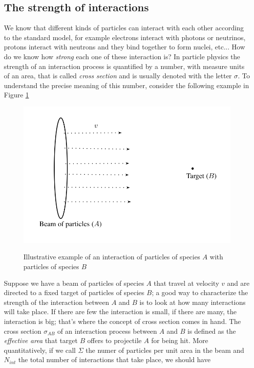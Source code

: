 \documentclass[11pt, a4paper,oneside,openright]{book}
\numberwithin{equation}{section}
\begin{document}
\subsection{The strength of interactions}
We know that different kinds of particles can interact with each other according to the standard model, for example electrons interact with photons or neutrinos, protons interact with neutrons and they bind together to form nuclei, etc... How do we know how \textit{strong} each one of these interaction is? In particle physics the strength of an interaction process is quantified by a number, with measure units of an area, that is called \textit{cross section} and is usually denoted with the letter $\sigma$. To understand the precise meaning of this number, consider the following example in Figure \ref{crossec}
\begin{figure}
\begin{center}
\includegraphics[scale=0.7]{Draw/cross_section.png}
\label{}
\end{center}
\caption{Illustrative example of an interaction of particles of species $A$ with particles of species $B$}
\label{crossec}
\end{figure}
Suppose we have a beam of particles of species $A$ that travel at velocity $v$ and are directed to a fixed target of particles of species $B$; a good way to characterize the strength of the interaction between $A$ and $B$ is to look at how many interactions will take place. If there are few the interaction is small, if there are many, the interaction is big; that's where the concept of cross section comes in hand. The cross section $\sigma_{AB}$ of an interaction process between $A$ and $B$ is defined as the \textit{effective area} that target $B$ offers to projectile $A$ for being hit. More quantitatively, if we call $\Sigma$ the numer of particles per unit area in the beam and $N_{int}$ the total number of interactions that take place, we should have
\end{document}
